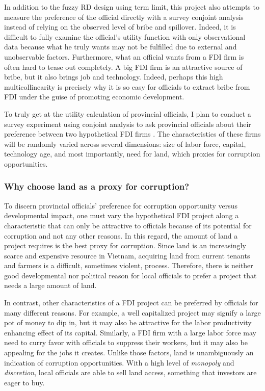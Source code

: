 In addition to the fuzzy RD design using term limit, this project also attempts to measure the preference of the official directly with a survey conjoint analysis instead of relying on the observed level of bribe and spillover. Indeed, it is difficult to fully examine the official's utility function with only observational data because what he truly wants may not be fulfilled due to external and unobservable factors. Furthermore, what an official wants from a FDI firm is often hard to tease out completely. A big FDI firm is an attractive source of bribe, but it also brings job and technology. Indeed, perhaps this high multicollinearity is precisely why it is so easy for officials to extract bribe from FDI under the guise of promoting economic development.

To truly get at the utility calculation of provincial officials, I plan to conduct a survey experiment using conjoint analysis to ask provincial officials about their preference between two hypothetical FDI firms \citep{Hainmueller2014}. The characteristics of these firms will be randomly varied across several dimensions: size of labor force, capital, technology age, and most importantly, need for land, which proxies for corruption opportunities.

\subsubsection{Why choose land as a proxy for corruption?}

To discern provincial officials' preference for corruption opportunity versus developmental impact, one must vary the hypothetical FDI project along a characteristic that can only be attractive to officials because of its potential for corruption and not any other reasons. In this regard, the amount of land a project requires is the best proxy for corruption. Since land is an increasingly scarce and expensive resource in Vietnam, acquiring land from current tenants and farmers is a difficult, sometimes violent, process. Therefore, there is neither good developmental nor political reason for local officials to prefer a project that needs a large amount of land. 

In contrast, other characteristics of a FDI project can be preferred by officials for many different reasons. For example, a well capitalized project may signify a large pot of money to dip in, but it may also be attractive for the labor productivity enhancing effect of its capital. Similarly, a FDI firm with a large labor force may need to curry favor with officials to suppress their workers, but it may also be appealing for the jobs it creates.  Unlike those factors, land is unambiguously an indication of corruption opportunities. With a high level of \textit{monopoly} and \textit{discretion}, local officials are able to sell land access, something that investors are eager to buy.

